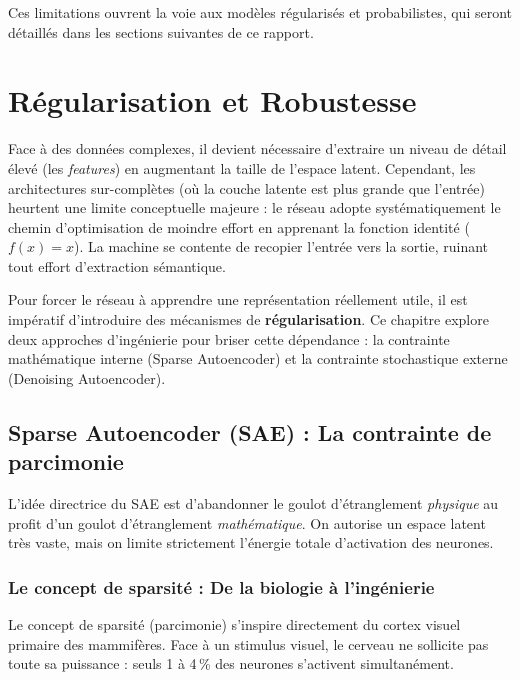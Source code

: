 \documentclass[11pt,a4paper]{report}
\begin{document}
Ces limitations ouvrent la voie aux modèles régularisés et probabilistes, qui seront détaillés dans les sections suivantes de ce rapport.

\chapter{Régularisation et Robustesse}
Face à des données complexes, il devient nécessaire d'extraire un niveau de détail élevé (les \textit{features}) en augmentant la taille de l'espace latent. Cependant, les architectures sur-complètes (où la couche latente est plus grande que l'entrée) heurtent une limite conceptuelle majeure : le réseau adopte systématiquement le chemin d'optimisation de moindre effort en apprenant la fonction identité ($f(x) = x$). La machine se contente de recopier l'entrée vers la sortie, ruinant tout effort d'extraction sémantique.

Pour forcer le réseau à apprendre une représentation réellement utile, il est impératif d'introduire des mécanismes de \textbf{régularisation}. Ce chapitre explore deux approches d'ingénierie pour briser cette dépendance : la contrainte mathématique interne (Sparse Autoencoder) et la contrainte stochastique externe (Denoising Autoencoder).

\section{Sparse Autoencoder (SAE) : La contrainte de parcimonie}

L'idée directrice du SAE est d'abandonner le goulot d'étranglement \textit{physique} au profit d'un goulot d'étranglement \textit{mathématique}. On autorise un espace latent très vaste, mais on limite strictement l'énergie totale d'activation des neurones.

\subsection{Le concept de sparsité : De la biologie à l'ingénierie}

Le concept de sparsité (parcimonie) s'inspire directement du cortex visuel primaire des mammifères. Face à un stimulus visuel, le cerveau ne sollicite pas toute sa puissance : seuls 1 à 4\,\% des neurones s'activent simultanément. 
\end{document}
